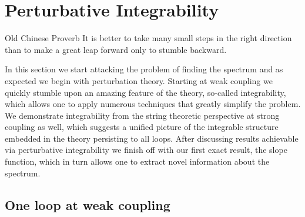 
\section{Perturbative Integrability}

\begin{chapquote}{Old Chinese Proverb}
It is better to take many small steps in the right direction than to make a great leap forward only to stumble backward.
\end{chapquote}

\noindent In this section we start attacking the problem of finding the spectrum and as expected we begin with perturbation theory.
Starting at weak coupling we quickly stumble upon an amazing feature of the theory, so-called integrability, which allows one to apply numerous techniques that greatly simplify the problem.
We demonstrate integrability from the string theoretic perspective at strong coupling as well, which suggests a unified picture of the integrable structure embedded in the theory persisting to all loops.
After discussing results achievable via perturbative integrability we finish off with our first exact result, the slope function, which in turn allows one to extract novel information about the spectrum.

\subsection{One loop at weak coupling}

